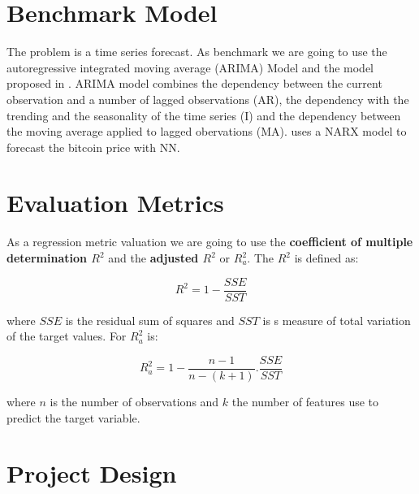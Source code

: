 \documentclass{article}
\begin{document}
\section{Benchmark Model} \label{benchmark}

The problem is a time series forecast. As benchmark we are going to use the autoregressive integrated moving average (ARIMA) Model and the model proposed  in \cite{ARTICLE:17}.  ARIMA model combines the dependency between the current observation and a number of lagged observations (AR), the dependency with the trending and the seasonality of the time series (I) and the dependency between the moving average applied to lagged obervations (MA). \cite{ARTICLE:17} uses a NARX model to forecast the bitcoin price with NN.


\section{Evaluation Metrics} \label{evaluation}

As a regression metric valuation we are going to use the  \textbf{coefficient of multiple determination $ R^2 $} and the \textbf{ adjusted $ R^2 $} or $ R^2_a $. The  $ R^2 $ is defined as:

\begin{equation}
R^2=1-\frac{SSE}{SST}
\end{equation}

where $ SSE $ is the residual sum of squares and $ SST $ is s measure of total variation of the target values. For $ R^2_a $ is:

\begin{equation}
R^2_a=1-\frac{n-1}{n-(k+1)}. \frac{SSE}{SST}
\end{equation}


where $ n $ is the number of observations and $ k $ the number of features use to predict the target variable.

\section{Project Design} \label{project}
\end{document}
